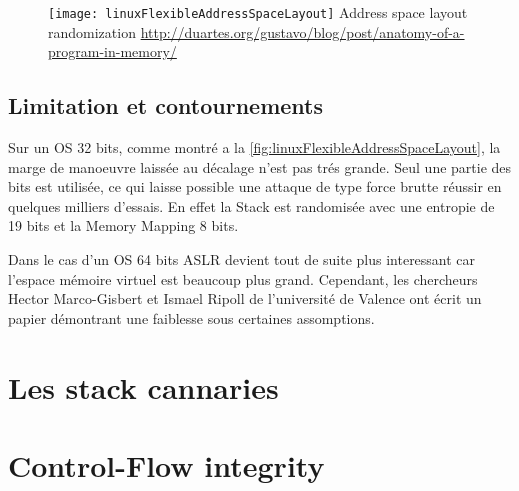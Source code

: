 \begin{figure}[H]
	\centering
	\texttt{[image: linuxFlexibleAddressSpaceLayout]}
	{Address space layout randomization}
	{\url{http://duartes.org/gustavo/blog/post/anatomy-of-a-program-in-memory/}}
	\label{fig:linuxFlexibleAddressSpaceLayout}
\end{figure}

\subsection{Limitation et contournements}

Sur un OS 32 bits, comme montré a la \autoref{fig:linuxFlexibleAddressSpaceLayout}, la marge de manoeuvre laissée au décalage n'est pas trés grande. Seul une partie des bits est utilisée, ce qui laisse possible une attaque de type force brutte réussir en quelques milliers d'essais. En effet la Stack est randomisée avec une entropie de 19 bits et la Memory Mapping 8 bits.

Dans le cas d'un OS 64 bits ASLR devient tout de suite plus interessant car l'espace mémoire virtuel est beaucoup plus grand. Cependant, les chercheurs Hector Marco-Gisbert et Ismael Ripoll de l'université de Valence ont écrit un papier démontrant une faiblesse sous certaines assomptions.

\section{Les stack cannaries}



\section{Control-Flow integrity}




